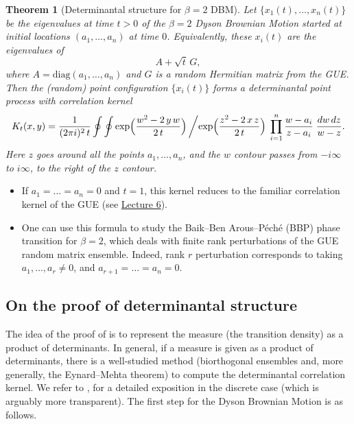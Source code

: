 \documentclass[letterpaper,11pt,oneside,reqno]{article}
\numberwithin{equation}{section}
\newtheorem{theorem}[proposition]{Theorem}
\theoremstyle{definition}
\begin{document}
\begin{theorem}[Determinantal structure for $\beta=2$ DBM]
\label{thm:dbm-det-kernel}
Let $\{x_1(t),\dots,x_n(t)\}$ be the eigenvalues at time $t>0$ of the $\beta=2$ Dyson Brownian Motion started at initial locations $(a_1,\dots,a_n)$ at time $0$.  Equivalently, these $x_i(t)$ are the eigenvalues of
\[
A + \sqrt{t}\,G,
\]
where $A=\mathrm{diag}(a_1,\dots,a_n)$ and $G$ is a random Hermitian matrix from the GUE.  Then the (random) point configuration $\{x_i(t)\}$ forms a determinantal point process with correlation kernel
\[
K_t(x,y)
=
\frac{1}{(2\pi i)^2\,t}
\oint \oint
\exp\Bigl(\frac{w^2 - 2\,y\,w}{2\,t}\Bigr)\,
\biggl/
\exp\Bigl(\frac{z^2 - 2\,x\,z}{2\,t}\Bigr)
\;\prod_{i=1}^n \frac{w - a_i}{z - a_i}
\;\frac{dw\,dz}{w - z}.
\]
Here $z$ goes around all the points $a_1,\ldots,a_n $,
and the $w$ contour
passes from $-i\infty$ to $i\infty$, to the right of the $z$ contour.
\end{theorem}

\begin{itemize}
	\item If $a_1=\dots=a_n=0$ and $t=1$, this kernel reduces to the familiar correlation kernel of the GUE (see \href{https://lpetrov.cc/rmt25/rmt25-notes/rmt2025-l06.pdf}{Lecture 6}).
\item
	One can use this formula to study the Baik--Ben
	Arous--P\'ech\'e (BBP)
	\cite{BBP2005phase}
	phase transition for $\beta=2$,
	which deals with finite rank perturbations of the GUE random matrix ensemble.
	Indeed, rank $r$ perturbation corresponds to taking $a_1,\ldots,a_r\ne0 $,
	and $a_{r+1}=\dots=a_n=0$.
\end{itemize}

\subsection{On the proof of determinantal structure}

The idea of the proof of  is to
represent the measure (the transition density) as a
product of determinants. In general,
if a measure is given as a product of determinants,
there is a well-studied method (biorthogonal ensembles and,
more generally, the Eynard--Mehta theorem)
to compute the determinantal correlation kernel.
We refer to
\cite{borodin2005eynard},
\cite{Borodin2009} for a detailed exposition
in the discrete case (which is arguably more transparent).
The first step for the Dyson Brownian Motion is as follows.
\end{document}
